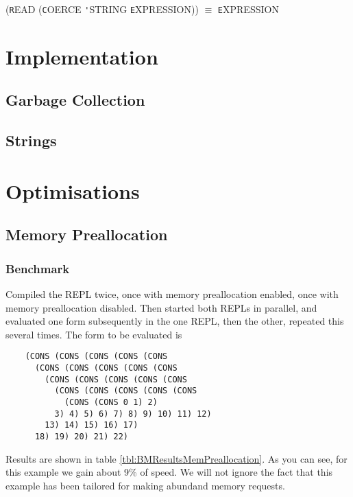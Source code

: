\documentclass[12pt]{article}
\begin{document}
({\texttt READ} ({\texttt COERCE} {\texttt 'STRING} {\texttt EXPRESSION})) $\equiv$ {\texttt EXPRESSION}

\section{Implementation}

\subsection{Garbage Collection}

\subsection{Strings}



\section{Optimisations}

\subsection{Memory Preallocation}

\subsubsection{Benchmark}


Compiled the REPL twice, once with memory preallocation enabled, once with
memory preallocation disabled.
Then started both REPLs in parallel, and evaluated one form subsequently in the
one REPL, then the other, repeated this several times.
The form to be evaluated is

\begin{verbatim}
    (CONS (CONS (CONS (CONS (CONS 
      (CONS (CONS (CONS (CONS (CONS 
        (CONS (CONS (CONS (CONS (CONS 
          (CONS (CONS (CONS (CONS (CONS 
            (CONS (CONS 0 1) 2)
          3) 4) 5) 6) 7) 8) 9) 10) 11) 12) 
        13) 14) 15) 16) 17) 
      18) 19) 20) 21) 22)
\end{verbatim}

Results are shown in table \ref{tbl:BMResultsMemPreallocation}.
As you can see, for this example we gain about 9\% of speed.
We will not ignore the fact that this example has been tailored for making
abundand memory requests.
\end{document}
